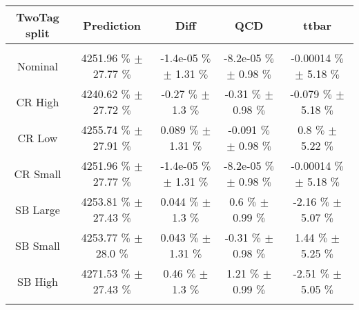 \begin{footnotesize} 
\begin{tabular}{c|c|c|c|c} 
 TwoTag split & Prediction & Diff & QCD & ttbar \\ 
\hline\hline 
& & & & \\ 
Nominal & 4251.96 $\%$  $\pm$ 27.77 $\%$  & -1.4e-05 $\%$  $\pm$ 1.31 $\%$  & -8.2e-05 $\%$  $\pm$ 0.98 $\%$  & -0.00014 $\%$  $\pm$ 5.18 $\%$ \\ 
CR High & 4240.62 $\%$  $\pm$ 27.72 $\%$  & -0.27 $\%$  $\pm$ 1.3 $\%$  & -0.31 $\%$  $\pm$ 0.98 $\%$  & -0.079 $\%$  $\pm$ 5.18 $\%$ \\ 
CR Low & 4255.74 $\%$  $\pm$ 27.91 $\%$  & 0.089 $\%$  $\pm$ 1.31 $\%$  & -0.091 $\%$  $\pm$ 0.98 $\%$  & 0.8 $\%$  $\pm$ 5.22 $\%$ \\ 
CR Small & 4251.96 $\%$  $\pm$ 27.77 $\%$  & -1.4e-05 $\%$  $\pm$ 1.31 $\%$  & -8.2e-05 $\%$  $\pm$ 0.98 $\%$  & -0.00014 $\%$  $\pm$ 5.18 $\%$ \\ 
SB Large & 4253.81 $\%$  $\pm$ 27.43 $\%$  & 0.044 $\%$  $\pm$ 1.3 $\%$  & 0.6 $\%$  $\pm$ 0.99 $\%$  & -2.16 $\%$  $\pm$ 5.07 $\%$ \\ 
SB Small & 4253.77 $\%$  $\pm$ 28.0 $\%$  & 0.043 $\%$  $\pm$ 1.31 $\%$  & -0.31 $\%$  $\pm$ 0.98 $\%$  & 1.44 $\%$  $\pm$ 5.25 $\%$ \\ 
SB High & 4271.53 $\%$  $\pm$ 27.43 $\%$  & 0.46 $\%$  $\pm$ 1.3 $\%$  & 1.21 $\%$  $\pm$ 0.99 $\%$  & -2.51 $\%$  $\pm$ 5.05 $\%$ \\ 
& & & & \\ 
\hline\hline 
\end{tabular} 
\end{footnotesize} 
\newline 
